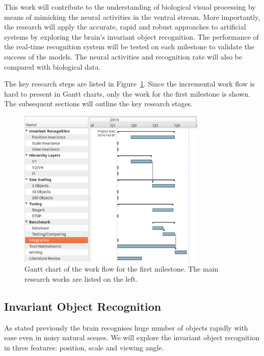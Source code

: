 This work will contribute to the understanding of biological visual processing by means of mimicking the neural activities in the ventral stream.
More importantly, the research will apply the accurate, rapid and robust approaches to artificial systems by exploring the brain's invariant object recognition.
The performance of the real-time recognition system will be tested on each milestone to validate the success of the models.
The neural activities and recognition rate will also be compared with biological data.

The key research steps are listed in Figure~\ref{Fig:gantt}.
Since the incremental work flow is hard to present in Gantt charts, only the work for the first milestone is shown.
The subsequent sections will outline the key research stages.



\begin{figure}[h!]
	\centering
	\includegraphics[width=0.8\textwidth]{pics/gantt.pdf}
	\caption{Gantt chart of the work flow for the first milestone.
	The main research works are listed on the left.
	}
	\label{Fig:gantt}
\end{figure}
\subsection{Invariant Object Recognition}
As stated previously the brain recognises huge number of objects rapidly with ease even in noisy natural scenes. We will explore the invariant object recognition in three features: position, scale and viewing angle.
